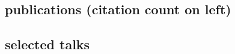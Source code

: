 \documentclass[]{luger-cv} %
\begin{document}
\begin{changemargin}{-4.5cm}{0cm}
\vspace*{1cm}
\ifdefined \withpubs

    \section{publications {\footnotesize \normalfont (citation count on left)}}
\end{changemargin}
\begin{changemargin}{-4.1cm}{0cm}
    \begin{list}{}{\pubslist}
        
    \end{list}
    \vspace{1em}
\fi
\end{changemargin}
\begin{changemargin}{-4.5cm}{0cm}
\ifdefined \withtalks
    \section{selected talks}
    \begin{list}{}{\pubslist}
        
    \end{list}
\fi
\end{changemargin}
\end{document}
